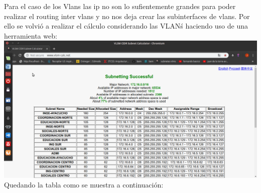 \begin{landscape}
\newpage
Para el caso de los Vlans las ip no son lo sufientemente grandes para poder realizar el routing inter vlans y no nos deja crear las subinterfaces de vlans. Por ello se volvi\'o a realizar el c\'alculo considerando las VLAN\' s haciendo uso de una herramienta web: \\ 
\includegraphics[scale=0.44]{img/vlsm-calc.png}\\
Quedando la tabla como se muestra a continuaci\'on:


\end{landscape}
\\

